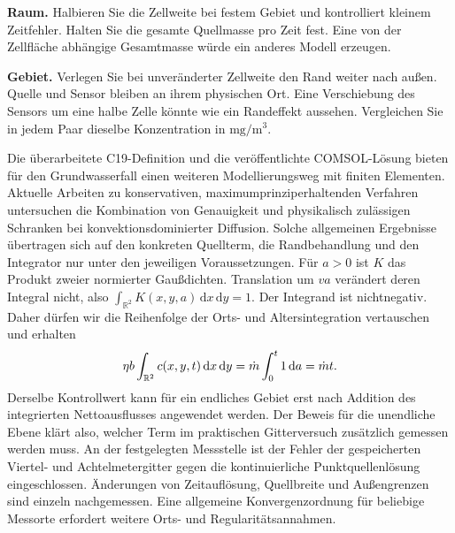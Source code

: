 \textbf{Raum.} Halbieren Sie die Zellweite bei festem Gebiet und kontrolliert kleinem Zeitfehler. Halten Sie die gesamte Quellmasse pro Zeit fest. Eine von der Zellfläche abhängige Gesamtmasse würde ein anderes Modell erzeugen.

\textbf{Gebiet.} Verlegen Sie bei unveränderter Zellweite den Rand weiter nach außen. Quelle und Sensor bleiben an ihrem physischen Ort. Eine Verschiebung des Sensors um eine halbe Zelle könnte wie ein Randeffekt aussehen. Vergleichen Sie in jedem Paar dieselbe Konzentration in \(\mathrm{mg/m^3}\).


Die überarbeitete C19-Definition und die veröffentlichte COMSOL-Lösung bieten für den Grundwasserfall einen weiteren Modellierungsweg mit finiten Elementen. Aktuelle Arbeiten zu konservativen, maximumprinziperhaltenden Verfahren untersuchen die Kombination von Genauigkeit und physikalisch zulässigen Schranken bei konvektionsdominierter Diffusion. Solche allgemeinen Ergebnisse übertragen sich auf den konkreten Quellterm, die Randbehandlung und den Integrator nur unter den jeweiligen Voraussetzungen.
Für \(a>0\) ist \(K\) das Produkt zweier normierter Gaußdichten. Translation um \(va\) verändert deren Integral nicht, also \(\int_{\mathbb R^2}K(x,y,a)\,\mathrm dx\,\mathrm dy=1\). Der Integrand ist nichtnegativ. Daher dürfen wir die Reihenfolge der Orts- und Altersintegration vertauschen und erhalten
\[
 \eta b\int_{\mathbb R^2}c(x,y,t)\,\mathrm dx\,\mathrm dy
   =\dot m\int_0^t 1\,\mathrm{d} a=\dot m t .
\]
Derselbe Kontrollwert kann für ein endliches Gebiet erst nach Addition des integrierten Nettoausflusses angewendet werden. Der Beweis für die unendliche Ebene klärt also, welcher Term im praktischen Gitterversuch zusätzlich gemessen werden muss.
An der festgelegten Messstelle ist der Fehler der gespeicherten Viertel- und Achtelmetergitter gegen die kontinuierliche Punktquellenlösung eingeschlossen. Änderungen von Zeitauflösung, Quellbreite und Außengrenzen sind einzeln nachgemessen. Eine allgemeine Konvergenzordnung für beliebige Messorte erfordert weitere Orts- und Regularitätsannahmen.
